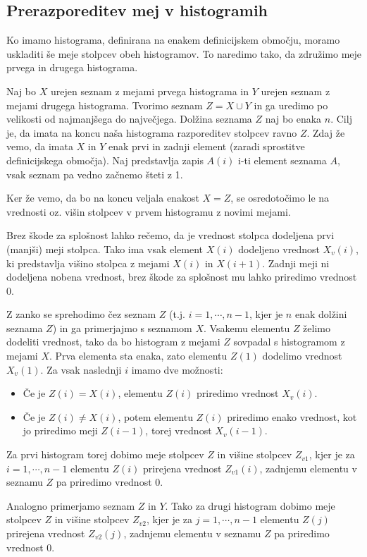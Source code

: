 \subsection{Prerazporeditev mej v histogramih}
Ko imamo histograma, definirana na enakem definicijskem območju, moramo uskladiti še meje stolpcev obeh histogramov. To naredimo tako, da združimo meje prvega in drugega histograma.

Naj bo $X$ urejen seznam z mejami prvega histograma in $Y$ urejen seznam z mejami drugega histograma. Tvorimo seznam $Z = X \cup Y$ in ga uredimo po velikosti od najmanjšega do največjega. Dolžina seznama $Z$ naj bo enaka $n$. Cilj je, da imata na koncu naša histograma razporeditev stolpcev ravno $Z$. Zdaj že vemo, da imata $X$ in $Y$ enak prvi in zadnji element (zaradi sprostitve definicijskega območja). Naj predstavlja zapis $A(i)$ i-ti element seznama $A$, vsak seznam pa vedno začnemo šteti z 1.

Ker že vemo, da bo na koncu veljala enakost $X = Z$, se osredotočimo le na vrednosti oz. višin stolpcev v prvem histogramu z novimi mejami.

Brez škode za splošnost lahko rečemo,  da je vrednost stolpca dodeljena prvi (manjši) meji stolpca. Tako ima vsak element $X(i)$ dodeljeno vrednost $X_v(i)$, ki predstavlja višino stolpca z mejami $X(i)$ in $X(i+1)$. Zadnji meji ni dodeljena nobena vrednost, brez škode za splošnost mu lahko priredimo vrednost 0.

Z zanko se sprehodimo čez seznam $Z$ (t.j. $i = 1, \cdots, n-1$, kjer je $n$ enak dolžini seznama $Z$) in ga primerjajmo s seznamom $X$. Vsakemu elementu $Z$ želimo dodeliti vrednost, tako da bo histogram z mejami $Z$ sovpadal s histogramom z mejami $X$. Prva elementa sta enaka, zato elementu $Z(1)$ dodelimo vrednost $X_v(1)$. Za vsak naslednji $i$ imamo dve možnosti:
\begin{itemize}
	\item Če je $Z(i) = X(i)$, elementu $Z(i)$ priredimo vrednost $X_v(i)$. 
	\item Če je $Z(i) \neq X(i)$, potem elementu $Z(i)$ priredimo enako vrednost, kot jo priredimo meji $Z(i-1)$, torej vrednost $X_v(i-1)$.
\end{itemize}
Za prvi histogram torej dobimo meje stolpcev $Z$ in višine stolpcev $Z_{v1}$, kjer je za $i = 1, \cdots, n-1$ elementu $Z(i)$ prirejena vrednost $Z_{v1}(i)$, zadnjemu elementu v seznamu $Z$ pa priredimo vrednost $0$.

Analogno primerjamo seznam $Z$ in $Y$. Tako za drugi histogram dobimo meje stolpcev $Z$ in višine stolpcev $Z_{v2}$, kjer je za $j = 1, \cdots, n-1$ elementu $Z(j)$ prirejena vrednost $Z_{v2}(j)$, zadnjemu elementu v seznamu $Z$ pa priredimo vrednost $0$.

